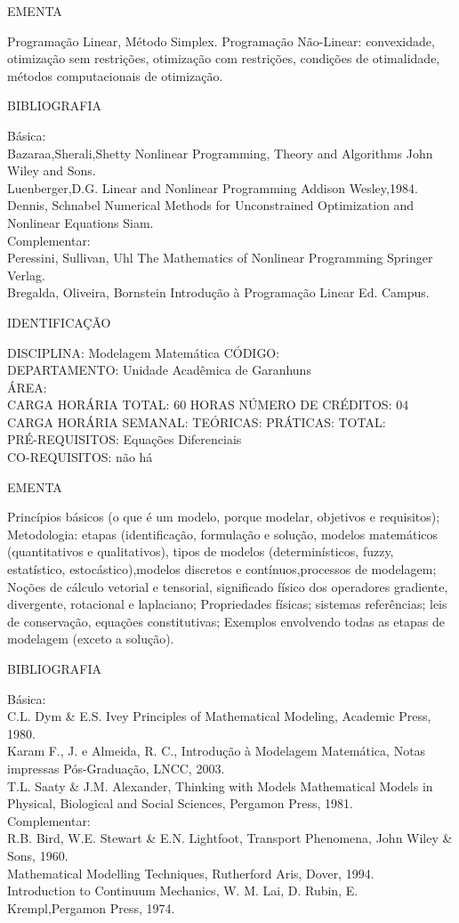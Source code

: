 \documentclass[
	12pt,				%
	openright,			%
  oneside,     %
	a4paper,			%
	english,			%
	french,				%
	spanish,			%
	brazil				%
	]{abntex2}
\begin{document}
\begin{apendicesenv}
EMENTA 

Programação Linear, Método Simplex. Programação Não-Linear: convexidade,
otimização sem restrições, otimização com restrições, condições de
otimalidade, métodos computacionais de otimização.

BIBLIOGRAFIA 

Básica:\\
Bazaraa,Sherali,Shetty  Nonlinear Programming, Theory and Algorithms
 John Wiley and Sons.\\
Luenberger,D.G.  Linear and Nonlinear Programming  Addison
Wesley,1984.\\
Dennis, Schnabel  Numerical Methods for Unconstrained Optimization
and Nonlinear Equations Siam.\\
Complementar:\\
Peressini, Sullivan, Uhl The Mathematics of Nonlinear Programming 
Springer Verlag.\\
Bregalda, Oliveira, Bornstein  Introdução à Programação Linear  Ed.
Campus.

\newpage IDENTIFICAÇÃO

DISCIPLINA: Modelagem Matemática CÓDIGO:\\ 
DEPARTAMENTO: Unidade Acadêmica de Garanhuns\\ 
ÁREA: \\
CARGA HORÁRIA TOTAL: 60 HORAS NÚMERO DE CRÉDITOS: 04\\
CARGA HORÁRIA SEMANAL: TEÓRICAS: PRÁTICAS: TOTAL: \\
PRÉ-REQUISITOS: Equações Diferenciais\\
CO-REQUISITOS: não há

EMENTA 

Princípios básicos (o que é um modelo, porque modelar, objetivos e requisitos); Metodologia: etapas (identificação, formulação e solução, modelos matemáticos (quantitativos e qualitativos), tipos de modelos (determinísticos, fuzzy, estatístico, estocástico),modelos discretos e contínuos,processos de modelagem; Noções de cálculo vetorial e tensorial, significado físico dos operadores gradiente, divergente, rotacional e laplaciano; Propriedades físicas; sistemas referências; leis de conservação, equações constitutivas; Exemplos envolvendo todas as etapas de modelagem (exceto a solução). 

BIBLIOGRAFIA 

Básica: \\
C.L. Dym \& E.S. Ivey  Principles of Mathematical Modeling, Academic
Press, 1980.\\
Karam F., J. e Almeida, R. C., Introdução à Modelagem Matemática, Notas
impressas Pós-Graduação, LNCC, 2003.\\
T.L. Saaty \& J.M. Alexander, Thinking with Models  Mathematical
Models in Physical, Biological and Social Sciences, Pergamon Press, 1981.\\
Complementar:\\
R.B. Bird, W.E. Stewart \& E.N. Lightfoot, Transport Phenomena, John
Wiley \& Sons, 1960.\\
Mathematical Modelling Techniques, Rutherford Aris, Dover, 1994.\\
Introduction to Continuum Mechanics, W. M. Lai, D. Rubin, E.
Krempl,Pergamon Press, 1974.


\end{apendicesenv}
\end{document}
